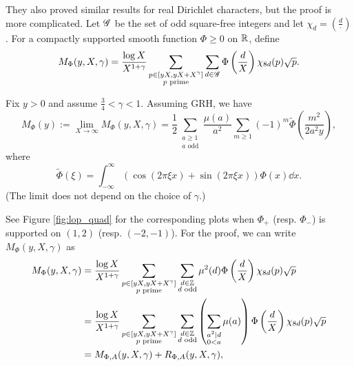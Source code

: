 They also proved similar results for real Dirichlet characters, but the proof is more complicated.
Let $\mathscr{G}$ be the set of odd square-free integers and let $\chi_{d} = \left(\frac{d}{\cdot}\right)$.
For a compactly supported smooth function $\Phi \ge 0$ on $\mathbb{R}$, define
\begin{equation}
    M_{\Phi}(y, X, \gamma) = \frac{\log X}{X^{1 + \gamma}} \sum_{\substack{p \in [yX, yX + X^\gamma] \\ p \text{ prime}}} \sum_{d \in \mathscr{G}} \Phi\left(\frac{d}{X}\right) \chi_{8d}(p) \sqrt{p}.
\end{equation}

\begin{theorem}
    \label{thm:lop_dirichlet_quad}
    Fix $y > 0$ and assume $\frac{3}{4} < \gamma < 1$.
    Assuming GRH, we have
    \begin{equation}
        \label{eqn:lop_murm_quad}
        M_{\Phi} (y) := \lim_{X \to \infty} M_{\Phi}(y, X, \gamma) = \frac{1}{2} \sum_{\substack{a \ge 1 \\ a \text{ odd}}} \frac{\mu(a)}{a^2} \sum_{m \ge 1} (-1)^{m} \widetilde{\Phi} \left(\frac{m^2}{2 a^2 y}\right),
    \end{equation}
    where
    \begin{equation}
        \widetilde{\Phi}(\xi) = \int_{-\infty}^{\infty} (\cos(2 \pi \xi x) + \sin(2 \pi \xi x)) \Phi(x) \dd x.
    \end{equation}
    (The limit does not depend on the choice of $\gamma$.)
\end{theorem}
See Figure \ref{fig:lop_quad} for the corresponding plots when $\Phi_+$ (resp. $\Phi_-$) is supported on $(1, 2)$ (resp. $(-2, -1)$).
For the proof, we can write $M_\Phi(y, X, \gamma)$ as
\begin{align*}
    M_\Phi(y, X, \gamma) &= \frac{\log X}{X^{1 + \gamma}} \sum_{\substack{p \in [yX, yX + X^\gamma] \\ p \text{ prime}}} \sum_{\substack{d \in \mathbb{Z} \\ d \text{ odd}}} \mu^2(d) \Phi\left(\frac{d}{X}\right) \chi_{8d}(p) \sqrt{p} \\
    &= \frac{\log X}{X^{1 + \gamma}} \sum_{\substack{p \in [yX, yX + X^\gamma] \\ p \text{ prime}}} \sum_{\substack{d \in \mathbb{Z} \\ d \text{ odd}}} \left(\sum_{\substack{a^2 \mid d \\ 0 < a}}\mu(a)\right) \Phi\left(\frac{d}{X}\right) \chi_{8d}(p) \sqrt{p} \\
    &= M_{\Phi, A}(y, X, \gamma) + R_{\Phi, A}(y, X, \gamma),
\end{align*}
